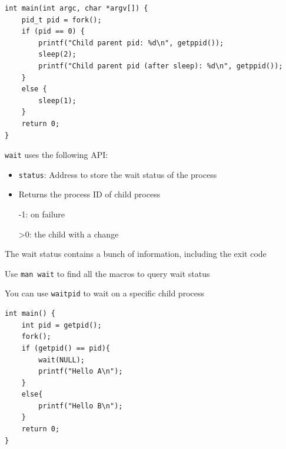   \begin{slide}


    \vspace{-5mm}
    \begin{verbatim}
int main(int argc, char *argv[]) {
    pid_t pid = fork();
    if (pid == 0) {
        printf("Child parent pid: %d\n", getppid());
        sleep(2);
        printf("Child parent pid (after sleep): %d\n", getppid());
    }
    else {
        sleep(1);
    }
    return 0;
}

    \end{verbatim}

  \end{slide}

\begin{slide}

    
    \texttt{wait} uses the following API:
    \begin{itemize}
      \item \texttt{status}: Address to store the wait status of the process
      \item Returns the process ID of child process

            \leftspace{}-1: on failure

            \leftspace{}>0: the child with a change
    \end{itemize}
    \bigskip

    The wait status contains a bunch of information, including the exit code

    \leftspace{}Use \texttt{man wait} to find all the macros to query wait status

    \leftspace{}\leftspace{}You can use \texttt{waitpid} to wait on a specific child process

\end{slide}

\begin{slide}

    
\begin{verbatim}
int main() {
    int pid = getpid();
    fork();
    if (getpid() == pid){
        wait(NULL);
        printf("Hello A\n");
    }
    else{
        printf("Hello B\n");
    }
    return 0;
}
\end{verbatim}
    
\end{slide}

